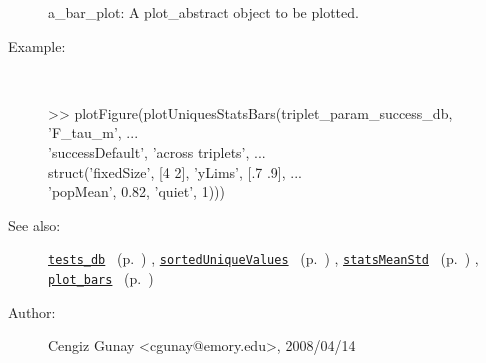 \begin{description}
	a\_bar\_plot: A plot\_abstract object to be plotted.
%
\item[Example:]~
\begin{lyxcode} >> plotFigure(plotUniquesStatsBars(triplet\_param\_success\_db, 'F\_tau\_m', ...
\\%
                                'successDefault', 'across triplets', ...
\\%
                                struct('fixedSize', [4 2], 'yLims', [.7 .9], ...
\\%
                                       'popMean', 0.82, 'quiet', 1)))
\\%
\end{lyxcode}
%
\item[See also:]%
\hyperlink{ref_tests_db}{\texttt{tests\_db}}%
\ (p.~\pageref{ref_tests_db})%
%
, \hyperlink{ref_sortedUniqueValues}{\texttt{sortedUniqueValues}}%
\ (p.~\pageref{ref_sortedUniqueValues})%
%
, \hyperlink{ref_statsMeanStd}{\texttt{statsMeanStd}}%
\ (p.~\pageref{ref_statsMeanStd})%
%
, \hyperlink{ref_plot_bars}{\texttt{plot\_bars}}%
\ (p.~\pageref{ref_plot_bars})%
%
%
\item[Author:]%
Cengiz Gunay <cgunay@emory.edu>, 2008/04/14
%
\end{description}
\methodline%
